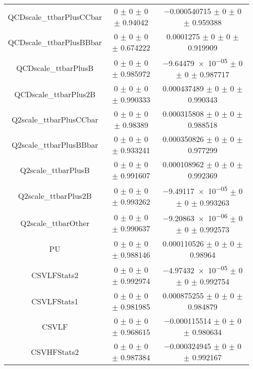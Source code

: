 \begin{table}
\begin{tabular}{ccc}
QCDscale\_ttbarPlusCCbar & \num{0} $\pm$ \num{0} $\pm$ \num{0} $\pm$ \num{0.94042} & \num{-0.000540715} $\pm$ \num{0} $\pm$ \num{0} $\pm$ \num{0.959388}\\
QCDscale\_ttbarPlusBBbar & \num{0} $\pm$ \num{0} $\pm$ \num{0} $\pm$ \num{0.674222} & \num{0.0001275} $\pm$ \num{0} $\pm$ \num{0} $\pm$ \num{0.919909}\\
QCDscale\_ttbarPlusB & \num{0} $\pm$ \num{0} $\pm$ \num{0} $\pm$ \num{0.985972} & \num{-9.64479e-05} $\pm$ \num{0} $\pm$ \num{0} $\pm$ \num{0.987717}\\
QCDscale\_ttbarPlus2B & \num{0} $\pm$ \num{0} $\pm$ \num{0} $\pm$ \num{0.990333} & \num{0.000437489} $\pm$ \num{0} $\pm$ \num{0} $\pm$ \num{0.990343}\\
Q2scale\_ttbarPlusCCbar & \num{0} $\pm$ \num{0} $\pm$ \num{0} $\pm$ \num{0.98389} & \num{0.000315808} $\pm$ \num{0} $\pm$ \num{0} $\pm$ \num{0.988518}\\
Q2scale\_ttbarPlusBBbar & \num{0} $\pm$ \num{0} $\pm$ \num{0} $\pm$ \num{0.933241} & \num{0.000350826} $\pm$ \num{0} $\pm$ \num{0} $\pm$ \num{0.977299}\\
Q2scale\_ttbarPlusB & \num{0} $\pm$ \num{0} $\pm$ \num{0} $\pm$ \num{0.991607} & \num{0.000108962} $\pm$ \num{0} $\pm$ \num{0} $\pm$ \num{0.992369}\\
Q2scale\_ttbarPlus2B & \num{0} $\pm$ \num{0} $\pm$ \num{0} $\pm$ \num{0.993262} & \num{-9.49117e-05} $\pm$ \num{0} $\pm$ \num{0} $\pm$ \num{0.993263}\\
Q2scale\_ttbarOther & \num{0} $\pm$ \num{0} $\pm$ \num{0} $\pm$ \num{0.990637} & \num{-9.20863e-06} $\pm$ \num{0} $\pm$ \num{0} $\pm$ \num{0.992573}\\
PU & \num{0} $\pm$ \num{0} $\pm$ \num{0} $\pm$ \num{0.988146} & \num{0.000110526} $\pm$ \num{0} $\pm$ \num{0} $\pm$ \num{0.98964}\\
CSVLFStats2 & \num{0} $\pm$ \num{0} $\pm$ \num{0} $\pm$ \num{0.992974} & \num{-4.97432e-05} $\pm$ \num{0} $\pm$ \num{0} $\pm$ \num{0.992754}\\
CSVLFStats1 & \num{0} $\pm$ \num{0} $\pm$ \num{0} $\pm$ \num{0.981985} & \num{0.000875255} $\pm$ \num{0} $\pm$ \num{0} $\pm$ \num{0.984879}\\
CSVLF & \num{0} $\pm$ \num{0} $\pm$ \num{0} $\pm$ \num{0.968615} & \num{-0.000115514} $\pm$ \num{0} $\pm$ \num{0} $\pm$ \num{0.980634}\\
CSVHFStats2 & \num{0} $\pm$ \num{0} $\pm$ \num{0} $\pm$ \num{0.987384} & \num{-0.000324945} $\pm$ \num{0} $\pm$ \num{0} $\pm$ \num{0.992167}\\

\end{tabular}
\end{table}
